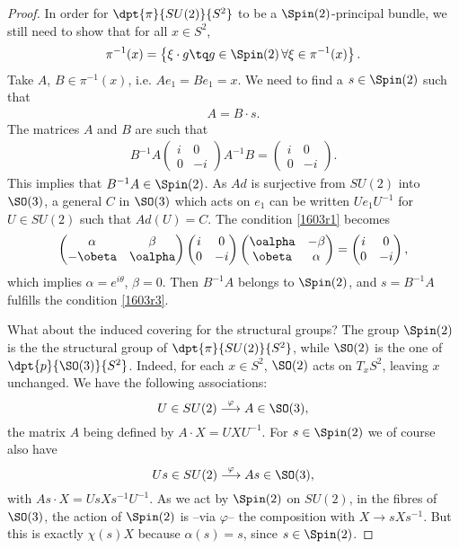 \begin{proof}
In order for $\dpt{\pi}{SU(2)}{S^2}$ to be a $\Spin(2)$-principal bundle, we still need to show that for all $x\in S^2$,
\[
   \pi^{-1}(x)=\left\{\xi\cdot g\tq g\in\Spin(2)\,\forall\xi\in\pi^{-1}(x)\right\}.
\]
Take $A$, $B\in\pi^{-1}(x)$, i.e. $Ae_1=Be_1=x$. We need to find a $s\in\Spin(2)$ such that
\begin{eqnarray}
 \label{1603r3} A=B\cdot s.
\end{eqnarray}
The matrices $A$ and $B$ are such that
\begin{eqnarray}\label{1603r1}
 B^{-1} A\begin{pmatrix}
 i&0\\
 0&-i
         \end{pmatrix}A^{-1} B=\begin{pmatrix}
 i&0\\
 0&-i
         \end{pmatrix}.
\end{eqnarray}
This implies that $B^{-1} A\in\Spin(2)$. As $Ad$ is surjective from $SU(2)$ into $\SO(3)$, a general $C$ in $\SO(3)$ which acts on $e_1$ can be written $Ue_1U^{-1}$ for $U\in SU(2)$ such that $Ad(U)=C$. The condition \eqref{1603r1} becomes
\[
\begin{pmatrix}
\alpha&\beta\\
-\obeta&\oalpha
\end{pmatrix}
\begin{pmatrix}
i&0\\
0&-i
\end{pmatrix}
\begin{pmatrix}
\oalpha&-\beta\\
\obeta&\alpha
\end{pmatrix}=
\begin{pmatrix}
i&0\\
0&-i
\end{pmatrix},
\]
which implies $\alpha=e^{i\theta}$, $\beta=0$. Then $B^{-1} A$ belongs to $\Spin(2)$, and $s=B^{-1} A$ fulfills the condition \eqref{1603r3}.

What about the induced covering for the structural groups? The group \( \Spin(2)\) is the the structural group of $\dpt{\pi}{SU(2)}{S^2}$, while \( \SO(2)\) is the one of $\dpt{p}{\SO(3)}{S^2}$. Indeed, for each $x\in S^2$, $\SO(2)$ acts on $T_xS^2$, leaving $x$ unchanged. We have the following associations:
\[
         U\in SU(2)\stackrel{\varphi}{\longrightarrow}A\in \SO(3),
\]
the matrix $A$ being defined by $A\cdot X=UXU^{-1}$. For $s\in\Spin(2)$ we of course also have
\[
         Us\in SU(2)\stackrel{\varphi}{\longrightarrow}As\in \SO(3),
\]
with $As\cdot X=UsXs^{-1} U^{-1}$. As we act by $\Spin(2)$ on $SU(2)$, in the fibres of $\SO(3)$, the action of $\Spin(2)$ is --via $\varphi$-- the composition with $X\to sXs^{-1}$. But this is exactly $\chi(s)X$ because $\alpha(s)=s$, since $s\in\Spin(2)$.
\end{proof}

